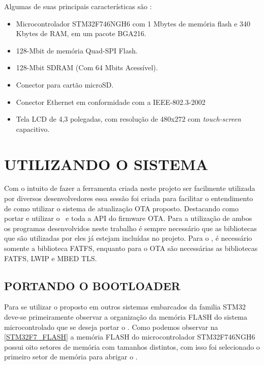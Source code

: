 Algumas de suas principais características são \cite{STM32F7}:
\begin{itemize}
    \item Microcontrolador STM32F746NGH6 com 1 Mbytes de memória flash e 340 Kbytes de RAM, em um pacote BGA216.
    \item 128-Mbit de memória Quad-SPI Flash.
    \item 128-Mbit SDRAM (Com 64 Mbits Acessível).
    \item Conector para cartão microSD.
    \item Conector Ethernet em conformidade com a IEEE-802.3-2002
    \item Tela LCD de 4,3 polegadas, com resolução de 480x272 com \textit{touch-screen} capacitivo.
    
\end{itemize}
\section{UTILIZANDO O SISTEMA}
Com o intuito de fazer a ferramenta criada neste projeto ser facilmente utilizada por diversos desenvolvedores essa sessão foi criada para facilitar o entendimento de como utilizar o sistema de atualização OTA proposto. Destacando como portar e utilizar o \bootloader\ e toda a API do firmware OTA. Para a utilização de ambos os programas desenvolvidos neste trabalho é sempre necessário que as bibliotecas que são utilizadas por eles já estejam incluídas no projeto. Para o \bootloader, é necessário somente a biblioteca FATFS, enquanto para o OTA são necessárias as bibliotecas FATFS, LWIP e MBED TLS.

\subsection{PORTANDO O BOOTLOADER}
Para se utilizar o \bootloader proposto em outros sistemas embarcados da familia STM32 deve-se primeiramente observar a organização da memória FLASH do sistema microcontrolado que se deseja portar o \bootloader. Como podemos observar na \autoref{STM32F7_FLASH} a memória FLASH do microcontrolador STM32F746NGH6 possui oito setores de memória com tamanhos distintos, com isso foi selecionado o primeiro setor de memória para abrigar o \bootloader.

